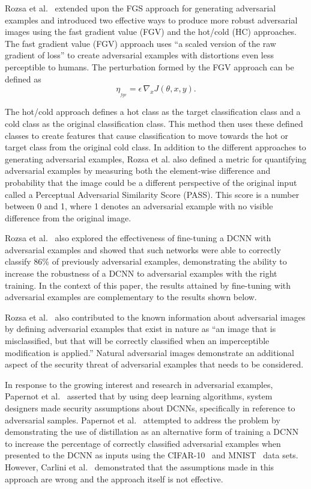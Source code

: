 \documentclass[conference]{IEEEtran}
\begin{document}
Rozsa et al.~\cite{c1} extended upon the FGS approach for generating adversarial examples and introduced two effective ways to produce more robust adversarial images using the fast gradient value (FGV) and the hot/cold (HC) approaches. The fast gradient value (FGV) approach uses ``a scaled version of the raw gradient of loss'' to create adversarial examples with distortions even less perceptible to humans.  The perturbation formed by the FGV approach can be defined as
\begin{equation}
	\label{eq:fgv}
	\eta_{_{fgv}}= \epsilon\,\nabla_xJ(\theta,x,y).
\end{equation}


The hot/cold approach defines a hot class as the target classification class and a cold class as the original classification class.  This method then uses these defined classes to create features that cause classification to move towards the hot or target class from the original cold class.  In addition to the different approaches to generating adversarial examples, Rozsa et al. also defined a metric for quantifying adversarial examples by measuring both the element-wise difference and probability that the image could be a different perspective of the original input called a Perceptual Adversarial Similarity Score (PASS).  This score is a number between 0 and 1, where 1 denotes an adversarial example with no visible difference from the original image.\par 
Rozsa et al.~\cite{c1} also explored the effectiveness of fine-tuning a DCNN with adversarial examples and showed that such networks were able to correctly classify 86\% of previously adversarial examples, demonstrating the ability to increase the robustness of a DCNN to adversarial examples with the right training.  In the context of this paper, the results attained by fine-tuning with adversarial examples are complementary to the results shown below.

Rozsa et al.~\cite{c2} also contributed to the known information about adversarial images by defining adversarial examples that exist in nature as ``an image that is misclassified, but that will be correctly classified when an imperceptible modification is applied.''  Natural adversarial images demonstrate an additional aspect of the security threat of adversarial examples that needs to be considered.  

In response to the growing interest and research in adversarial examples, Papernot et al.~\cite{c3} asserted that by using deep learning algorithms, system designers made security assumptions about DCNNs, specifically in reference to adversarial samples.   Papernot et al.~\cite{c3} attempted to address the problem by demonstrating the use of distillation as an alternative form of training a DCNN to increase the percentage of correctly classified adversarial examples when presented to the DCNN as inputs using the CIFAR-10~\cite{c11} and MNIST~\cite{c9} data sets.  However, Carlini et al.~\cite{c23} demonstrated that the assumptions made in this approach are wrong and the approach itself is not effective.  
\end{document}
